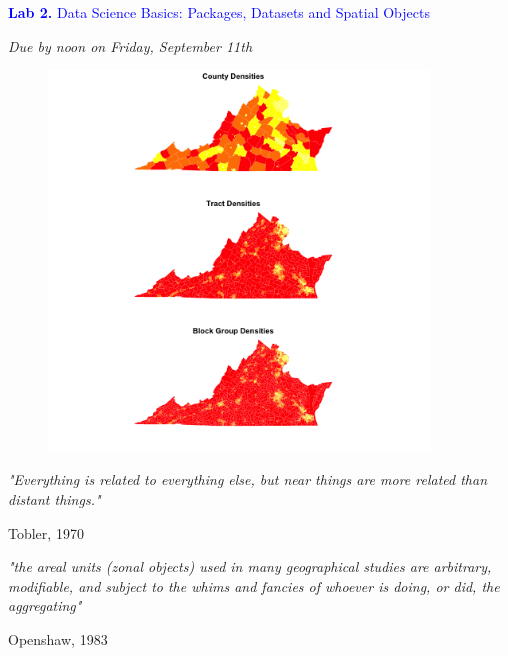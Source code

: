 \documentclass{article}
\begin{document}
\vspace*{.01mm}

\begin{center}

\Large{\textcolor{blue}{\textbf{Lab 2.}  Data Science Basics: Packages, Datasets and Spatial Objects}}

\vspace{4mm}

\textit{Due by noon on Friday, September 11th}\\

\end{center}

\begin{figure}[h!]
\begin{center}
\includegraphics[width=0.9\textwidth]{virginia.png}

\end{center}
\end{figure}

\setlength{\parindent}{0cm}

\large{\textit{"Everything is related to everything else, but near things are more related than distant things."}
\begin{flushright}
Tobler, 1970
\end{flushright}
}

\large{\textit{"the areal units (zonal objects) used in many geographical studies are arbitrary, modifiable, and subject to the whims and fancies of whoever is doing, or did, the aggregating"}
\begin{flushright}
Openshaw, 1983
\end{flushright}
}
\end{document}
